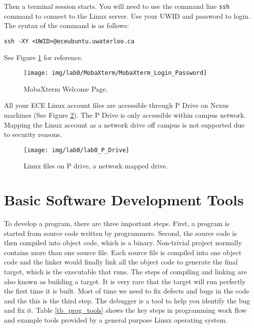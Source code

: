 Then a terminal session starts. You will need to use the command line \verb+ssh+ command to connect to the Linux server. Use your UWID and password to login. The syntax of the command is as follows:
\begin{lstlisting}[style=bash]
ssh -XY <UWID>@eceubuntu.uwaterloo.ca
\end{lstlisting}
See Figure \ref{fig_MobaXterm_Login_Password} for reference.
\begin{figure}[!htb]
  \centering
  \texttt{[image: img/lab0/MobaXterm/MobaXterm\_Login\_Password]}
  \caption{MobaXterm Welcome Page.}
  \label{fig_MobaXterm_Login_Password}
\end{figure}


All your ECE Linux account files are accessible through P Drive on Nexus machines (See Figure \ref{fig_lab0_P_Drive}). The P Drive is only accessible within campus network. Mapping the Linux account as a network drive off campus is not supported due to security reasons.
\begin{figure}[!htb]
  \centering
  \texttt{[image: img/lab0/lab0\_P\_Drive]}
  \caption{Linux files on P drive, a network mapped drive.}
  \label{fig_lab0_P_Drive}
\end{figure}

\section{Basic Software Development Tools}

To develop a program, there are three important steps.
First, a program is started from source code written by programmers. Second, the source code is then compiled into object code, which is a binary. Non-trivial project normally contains more than one source file. Each source file is compiled into one object code and the linker would finally link all the object code to generate the final target, which is the executable that runs. The steps of compiling and linking are also known as building a target. It is very rare that the target will run perfectly the first time it is built. Most of time we need to fix defects and bugs in the code and the this is the third step. The debugger is a tool to help you identify the bug and fix it. Table \ref{tb_prog_tools} shows the key steps in programming work flow and example tools provided by a general purpose Linux operating system.

